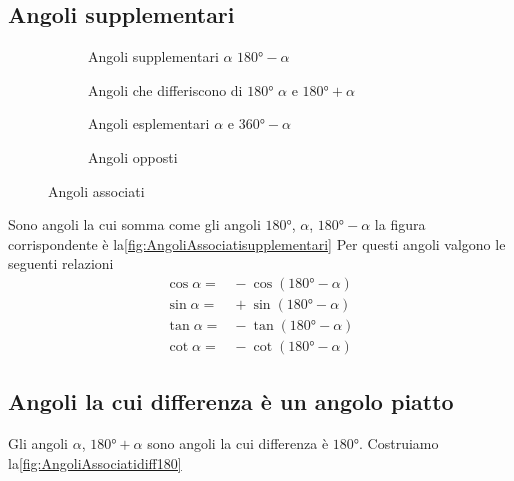 \subsection{Angoli supplementari}
\begin{figure}
	\centering
	\begin{subfigure}[b]{.48\linewidth}
	\centering
	\caption{Angoli supplementari $\alpha$ $\ang{180}-\alpha$}\label{fig:AngoliAssociatisupplementari}		
 \end{subfigure}
 \begin{subfigure}[b]{.48\linewidth}
 	\centering
 	
 	\caption{Angoli che differiscono di $\ang{180}$ $\alpha$ e $\ang{180}+\alpha$}
 	\label{fig:AngoliAssociatidiff180}	
 \end{subfigure}
 	\begin{subfigure}[b]{.49\linewidth}
 		\centering
 		
 		\caption{Angoli esplementari $\alpha$ e $\ang{360}-\alpha$}\label{fig:Angolidif360}
 	\end{subfigure}
 	\begin{subfigure}[b]{.49\linewidth}
 		\centering
 		
 		\caption{Angoli opposti}\label{fig:angoliopposti}
 	\end{subfigure}
\caption{Angoli associati}
	\label{fig:angoliassociati}
\end{figure}
Sono angoli la cui somma come gli angoli $\ang{180}$, $\alpha$, $\ang{180}-\alpha$ la figura corrispondente è la\nobs\vref{fig:AngoliAssociatisupplementari}
Per questi angoli valgono le seguenti relazioni
\begin{align*}
\cos\alpha=&{}-\cos(\ang{180}-\alpha)\\
\sin\alpha=&{}+\sin(\ang{180}-\alpha)\\
\tan\alpha=&{}-\tan(\ang{180}-\alpha)\\
\cot\alpha=&{}-\cot(\ang{180}-\alpha)
\end{align*}
\subsection{Angoli la cui differenza è un angolo piatto}
\label{sub:Dif180}
Gli angoli $\alpha$, $\ang{180}+\alpha$ sono angoli la cui differenza è $\ang{180}$. Costruiamo la\nobs\vref{fig:AngoliAssociatidiff180}

